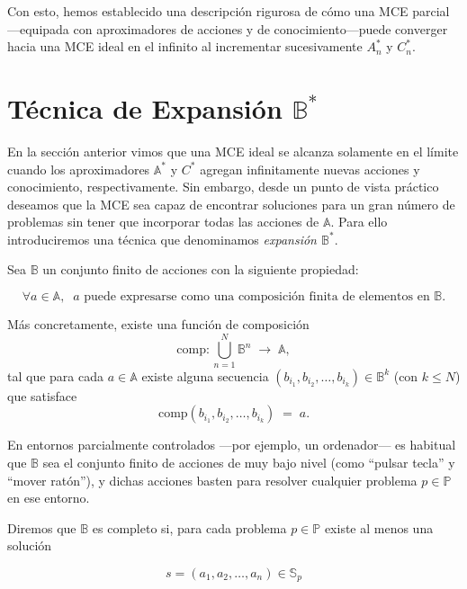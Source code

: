 Con esto, hemos establecido una descripción rigurosa de cómo una MCE
parcial—equipada con aproximadores de acciones y de conocimiento—puede 
converger hacia una MCE ideal en el infinito al incrementar sucesivamente
\(A_n^*\) y \(C_n^*\).

\section{Técnica de Expansión \(\mathbb{B}^*\)}

En la sección anterior vimos que una MCE ideal se alcanza solamente en el límite
cuando los aproximadores \(\mathbb{A}^*\) y \(C^*\) agregan infinitamente nuevas
acciones y conocimiento, respectivamente. Sin embargo, desde un punto de vista
práctico deseamos que la MCE sea capaz de encontrar soluciones para un gran
número de problemas sin tener que incorporar todas las acciones de
\(\mathbb{A}\). Para ello introduciremos una técnica que denominamos
\emph{expansión \(\mathbb{B}^*\)}.

Sea \(\mathbb{B}\) un conjunto finito de acciones con la siguiente propiedad:


\begin{equation}
\forall a \in \mathbb{A}, \;\; a \text{ puede expresarse como una composición finita de elementos en } \mathbb{B}.
\end{equation}

Más concretamente, existe una función de composición
\begin{equation}
\mathrm{comp} : \bigcup_{n=1}^N \mathbb{B}^n \;\longrightarrow\; \mathbb{A},
\end{equation}
tal que para cada \(a \in \mathbb{A}\) existe alguna secuencia
\((b_{i_1},b_{i_2},\dots,b_{i_k}) \in \mathbb{B}^k\) (con \(k \le N\)) que
satisface
\begin{equation}
\mathrm{comp}(b_{i_1},b_{i_2},\dots,b_{i_k}) \;=\; a.
\end{equation}

En entornos parcialmente controlados —por ejemplo, un ordenador— es habitual que
\(\mathbb{B}\) sea el conjunto finito de acciones de muy bajo nivel (como
“pulsar tecla” y “mover ratón”), y dichas acciones basten para resolver
cualquier problema \(p \in \mathbb{P}\) en ese entorno.

Diremos que \(\mathbb{B}\) es completo si, para cada problema \(p \in
\mathbb{P}\) existe al menos una solución

\begin{equation}
s = (a_1,a_2,\dots,a_n) \in \mathbb{S}_p
\end{equation}


